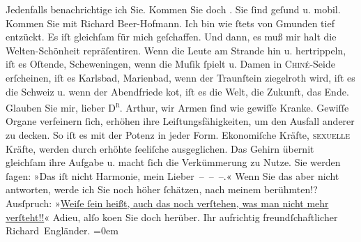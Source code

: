 \begin{ledgroupsized}[t]{13cm}
                    Jedenfalls benachrichtige ich Sie. Kommen Sie doch \label{K_L00468_2v}\label{K_L00468_2h}. Sie ſind geſund u. mobil.
                    Kommen Sie mit Richard Beer-Hofmann. Ich bin
                    wie ſtets von Gmunden tief entzückt. Es iſt
                    gleichſam für {\pb}mich geſchaffen. Und
                    dann, es muß mir halt die Welten-Schönheit 
                    repräſentiren. Wenn die Leute am Strande hin u. hertrippeln, iſt es Oſtende, Sch\introOben{}e\introOben{}weningen, wenn die Muſik ſpielt u. Damen in
                        \textsc{Chiné}-Seide erſcheinen, iſt es Karlsbad, Marienbad, wenn
                    der Traunſtein ziegelroth wird, iſt es die Schweiz u. wenn der Abendfriede ko{\geminationm}t, iſt  es die
                         Welt, die Zukunft, \introOben{}das
                        Ende.\introOben{} Glauben Sie mir, lieber \textsc{D\textsuperscript{r}}. Arthur, wir Armen ſind wie gewiſſe {\pb}Kranke. Gewiſſe Organe verfeinern
                    ſich, erhöhen ihre Leiſtungsfähigkeiten, um den Ausfall anderer zu decken. So
                    iſt es mit der Potenz in jeder Form. Ekonomiſche Kräfte, \textsc{sexuelle} Kräfte, werden durch erhöhte ſeeliſche ausgeglichen. Das
                    Gehirn überni{\geminationm}t gleichſam ihre Aufgabe u. macht
                    ſich die Verkümmerung zu Nutze.\pend
           \pstart
           Sie werden ſagen: »Das iſt nicht Harmonie, mein Lieber – – –.« {\pb}Wenn Sie das aber nicht antworten,
                    werde ich Sie noch höher ſchätzen, nach meinem berühmten\introOben{}!?\introOben{} Ausſpruch: »\uline{Weiſe ſein heißt,  auch das noch verſtehen, was man nicht mehr
                        verſteht!!}«\pend
           \pstart
           Adieu, alſo ko{\geminationm}en Sie doch herüber.\pend
           \pstart
           Ihr aufrichtig freundſchaftlicher{\\[\baselineskip]}\spacefill\mbox{Richard Engländer.}\pend
           \leftskip=0em{}          \endnumbering{}\end{ledgroupsized}  \newcommand{\dateiname}{L00468}\newcommand{\titel}{Peter Altenberg an Arthur Schnitzler, [30. 7. 1895]}\newcommand{\editorInnen}{Martin Anton Müller und Gerd-Hermann Susen}
            \footnotesize
\begin{ledgroupsized}[t]{11.5cm}
\end{ledgroupsized}
         
      